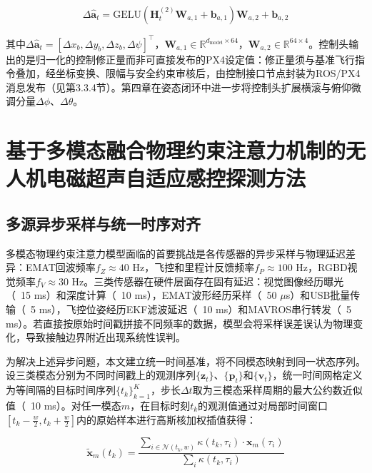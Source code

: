 \begin{equation}
\Delta\hat{\mathbf{a}}_t = \text{GELU}(\mathbf{H}_t^{(2)} \mathbf{W}_{a,1} + \mathbf{b}_{a,1}) \mathbf{W}_{a,2} + \mathbf{b}_{a,2}
\label{eq:action_head}
\end{equation}

其中$\Delta\hat{\mathbf{a}}_t = [\Delta x_b, \Delta y_b, \Delta z_b, \Delta \psi]^\top$，$\mathbf{W}_{a,1} \in \mathbb{R}^{d_{\text{model}} \times 64}$，$\mathbf{W}_{a,2} \in \mathbb{R}^{64 \times 4}$。控制头输出的是归一化的控制修正量而非可直接发布的PX4设定值：修正量须与基准飞行指令叠加，经坐标变换、限幅与安全约束审核后，由控制接口节点封装为ROS/PX4消息发布（见第3.3.4节）。第四章在姿态闭环中进一步将控制头扩展横滚与俯仰微调分量$\Delta\phi$、$\Delta\theta$。

\section{基于多模态融合物理约束注意力机制的无人机电磁超声自适应感控探测方法}

\subsection{多源异步采样与统一时序对齐}

多模态物理约束注意力模型面临的首要挑战是各传感器的异步采样与物理延迟差异：EMAT回波频率$f_Z \approx 40$ Hz，飞控和里程计反馈频率$f_P \approx 100$ Hz，RGBD视觉频率$f_V \approx 30$ Hz。三类传感器在硬件层面存在固有延迟：视觉图像经历曝光（~15 ms）和深度计算（~10 ms），EMAT波形经历采样（~50 $\mu$s）和USB批量传输（~5 ms），飞控位姿经历EKF滤波延迟（~10 ms）和MAVROS串行转发（~5 ms）。若直接按原始时间戳拼接不同频率的数据，模型会将采样误差误认为物理变化，导致接触边界附近出现系统性误判。

为解决上述异步问题，本文建立统一时间基准，将不同模态映射到同一状态序列。设三类模态分别为不同时间戳上的观测序列$\{\mathbf{z}_t\}$、$\{\mathbf{p}_t\}$和$\{\mathbf{v}_t\}$，统一时间网格定义为等间隔的目标时间序列$\{t_k\}_{k=1}^K$，步长$\Delta t$取为三模态采样周期的最大公约数近似值（~10 ms）。对任一模态$m$，在目标时刻$t_k$的观测值通过对局部时间窗口$[t_k - \frac{w}{2}, t_k + \frac{w}{2}]$内的原始样本进行高斯核加权插值获得：

\begin{equation}
\tilde{\mathbf{x}}_m(t_k) = \frac{\sum_{i \in \mathcal{N}(t_k, w)} \kappa(t_k, \tau_i) \cdot \mathbf{x}_m(\tau_i)}{\sum_{i} \kappa(t_k, \tau_i)}
\label{eq:weighted_interp_mm}
\end{equation}

